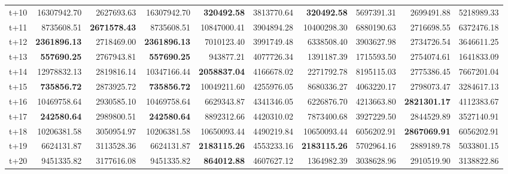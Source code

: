 \begin{table}[H]
\begin{tabular}{lrrrrrrrrr}
t+10  & 16307942.70  & 2627693.63  & 16307942.70  & \textbf{320492.58}  & 3813770.64  & \textbf{320492.58}  & 5697391.31  & 2699491.88  & 5218989.33  \\
t+11  & 8735608.51  & \textbf{2671578.43}  & 8735608.51  & 10847000.41  & 3904894.28  & 10400298.30  & 6880190.63  & 2716698.55  & 6372476.18  \\
t+12  & \textbf{2361896.13}  & 2718469.00  & \textbf{2361896.13}  & 7010123.40  & 3991749.48  & 6338508.40  & 3903627.98  & 2734726.54  & 3646611.25  \\
t+13  & \textbf{557690.25}  & 2767943.81  & \textbf{557690.25}  & 943877.21  & 4077726.34  & 1391187.39  & 1715593.50  & 2754074.61  & 1641833.09  \\
t+14  & 12978832.13  & 2819816.14  & 10347166.44  & \textbf{2058837.04}  & 4166678.02  & 2271792.78  & 8195115.03  & 2775386.45  & 7667201.04  \\
t+15  & \textbf{735856.72}  & 2873925.72  & \textbf{735856.72}  & 10049211.60  & 4255976.05  & 8680336.27  & 4063220.17  & 2798073.47  & 3284617.13  \\
t+16  & 10469758.64  & 2930585.10  & 10469758.64  & 6629343.87  & 4341346.05  & 6226876.70  & 4213663.80  & \textbf{2821301.17}  & 4112383.67  \\
t+17  & \textbf{242580.64}  & 2989800.51  & \textbf{242580.64}  & 8892312.66  & 4420310.02  & 7873400.68  & 3927229.50  & 2844529.89  & 3527140.91  \\
t+18  & 10206381.58  & 3050954.97  & 10206381.58  & 10650093.44  & 4490219.84  & 10650093.44  & 6056202.91  & \textbf{2867069.91}  & 6056202.91  \\
t+19  & 6624131.87  & 3113528.36  & 6624131.87  & \textbf{2183115.26}  & 4553233.16  & \textbf{2183115.26}  & 5702964.16  & 2889189.78  & 5033801.15  \\
t+20  & 9451335.82  & 3177616.08  & 9451335.82  & \textbf{864012.88}  & 4607627.12  & 1364982.39  & 3038628.96  & 2910519.90  & 3138822.86  \\

\bottomrule
\end{tabular}
\end{table}
